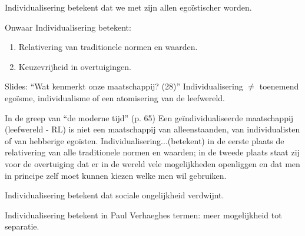 \documentclass[main.tex]{subfiles}
\begin{document}
\begin{examenvraag}
    \begin{stelling}
        Individualisering betekent dat we met zijn allen egoïstischer worden.
    \end{stelling}

    \begin{stelling-antwoord}{Onwaar}
        Individualisering betekent:
        \begin{enumerate}
            \item Relativering van traditionele normen en waarden.
            \item Keuzevrijheid in overtuigingen.
        \end{enumerate}
        \begin{citaat}{Slides: ``Wat kenmerkt onze maatschappij? (28)''}
            Individualisering $\neq$ toenemend ego\"isme, individualisme of een atomisering van de leefwereld.
        \end{citaat}
        \begin{citaat}{In de greep van ``de moderne tijd'' (p. 65)}
            Een ge\"individualiseerde maatschappij (leefwereld - RL) is niet een maatschappij van alleenstaanden, van individualisten of van hebberige ego\"isten.
            Individualisering...(betekent) in de eerste plaats de relativering van alle traditionele normen en waarden; in de tweede plaats staat zij voor de overtuiging dat er in de wereld vele mogelijkheden openliggen en dat men in principe zelf moet kunnen kiezen welke men wil gebruiken.
        \end{citaat}
    \end{stelling-antwoord}
\end{examenvraag}


\begin{examenvraag}
    \begin{stelling}
        Individualisering betekent dat sociale ongelijkheid verdwijnt.
    \end{stelling}

    \begin{antwoord}
    \end{antwoord}
\end{examenvraag}


\begin{examenvraag}
    \begin{stelling}
        Individualisering betekent in Paul Verhaeghes termen: meer mogelijkheid tot separatie.
    \end{stelling}

    \begin{antwoord}
    \end{antwoord}
\end{examenvraag}
\end{document}
